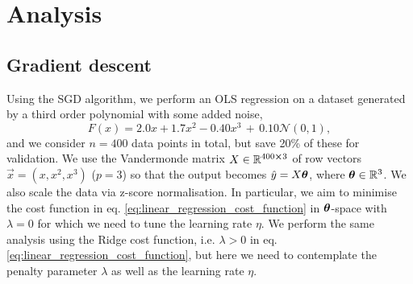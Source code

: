 \section{Analysis}\label{sec:analysis}






\subsection{Gradient descent}\label{sec:analysis_SGD}


    Using the SGD algorithm, we perform an OLS regression on a dataset generated by a third order polynomial with some added noise,
    \begin{equation}
        F(x) = 2.0x + 1.7x^2 -0.40x^3 \, +\, 0.10\mathcal{N}(0, 1),
    \end{equation}
    and we consider $n=400$ data points in total, but save 20\% of these for validation. We use the Vandermonde matrix $X\in \RR[400 \cross 3]$ of row vectors $\vec{x} = (x, x^2, x^3)$ ($p=3$) so that the output becomes $\hat{y} = X\svec{\theta}$, where $\svec{\theta}\in \RR[3]$. We also scale the data via z-score normalisation. In particular, we aim to minimise the cost function in eq. \eqref{eq:linear_regression_cost_function} in $\svec{\theta}$-space with $\lambda=0$ for which we need to tune the learning rate $\eta$. We perform the same analysis using the Ridge cost function, i.e. $\lambda > 0$ in eq. \eqref{eq:linear_regression_cost_function}, but here we need to contemplate the penalty parameter $\lambda$ as well as the learning rate $\eta$.

